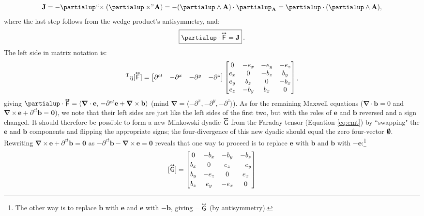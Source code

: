 \documentclass[12pt]{article}
\renewcommand{\vv}[1]{\mathbf{#1}}
\newcommand{\del}{\boldsymbol{\nabla}}
\newcommand{\tightoverset}[2]{%
  \mathop{#2}\limits^{\vbox to -.5ex{\kern-0.75ex\hbox{$#1$}\vss}}}
\newcommand{\inlinedy}[1]{\tightoverset{\text{\tiny$\bm\leftrightarrow$}}{#1}}
\newcommand{\fnoverset}[2]{%
  \mathop{#2}\limits^{\vbox to -.5ex{\kern-0.85ex\hbox{$#1$}\vss}}}
\newcommand{\footnotedy}[1]{\fnoverset{\text{\tiny$\bm\leftrightarrow$}}{#1}}
\newcommand{\capdy}[1]{ \overset{ \text{\tiny$\bm\leftrightarrow$} }{\vphantom{\text{\small{A}}}\smash{#1}} }
\begin{document}
\begin{equation*}
\vv J = - \partialup \mkern1mu `` \mkern-4mu \times ( \partialup \times \mkern-4mu " \mkern1mu \vv A ) = - ( \partialup \wedge \vv A ) \cdot \partialup_{\vv A} = \partialup \cdot (\partialup \wedge \vv A),
\end{equation*}
where the last step follows from the wedge product's antisymmetry, and:
\begin{equation}\label{eq:ime}
\boxed{ \vphantom{A_{A_A}} \partialup \cdot \capdy{\mathsf{F}} = \vv J } \, .
\end{equation}
The left side in matrix notation is:
\begin{equation*}
[\partialup]^{\mathrm{T}} \eta [\capdy{\mathsf{F}}]
=
\begin{bmatrix}
\partial^{ct} & - \partial^x & - \partial^y & - \partial^z
\end{bmatrix}
\begin{bmatrix}
0 & -e_x & -e_y & -e_z \\
e_x & 0 & -b_z & b_y \\
e_y & b_z & 0 & -b_x \\
e_z & -b_y & b_x & 0
\end{bmatrix} ,
\end{equation*}
giving $\partialup \cdot \inlinedy{\mathsf{F}} = \langle \del \cdot \vv e , \, - \partial^{ct} \vv e + \del \times \vv b \rangle$ (mind $\del = \langle - \partial^x , - \partial^y , - \partial^z \rangle$). As for the remaining Maxwell equations ($\del \cdot \vv b = 0$ and $\del \times \vv e + \partial^{ct} \vv b = \vv 0$), we note that their left sides are just like the left sides of the first two, but with the roles of $\vv e$ and $\vv b$ reversed and a sign changed. It should therefore be possible to form a new Minkowski dyadic $\inlinedy{\mathsf{G}}$ from the Faraday tensor (Equation \ref{eq:emt}) by ``swapping" the $\vv e$ and $\vv b$ components and flipping the appropriate signs; the four-divergence of this new dyadic should equal the zero four-vector $\textrm{\mbox{\boldmath $\emptyset$}}$. Rewriting $\del \times \vv e + \partial^{ct} \vv b = \vv 0$ as $- \partial^{ct} \vv b - \del \times \vv e = \vv 0$ reveals that one way to proceed is to replace $\vv e$ with $\vv b$ and $\vv b$ with $- \vv e$:\footnote{The other way is to replace $\vv b$ with $\vv e$ and $\vv e$ with $- \vv b$, giving $-\footnotedy{\mathsf{G}}$ (by antisymmetry).}
\begin{equation}\label{eq:mt}
[ \capdy{\mathsf{G}} ]
=
\begin{bmatrix}
0 & -b_x & -b_y & -b_z \\[.5ex]
b_x & 0 & e_z & -e_y \\[.5ex]
b_y & -e_z & 0 & e_x \\[.5ex]
b_z & e_y & -e_x & 0
\end{bmatrix}
\end{equation}
\end{document}
